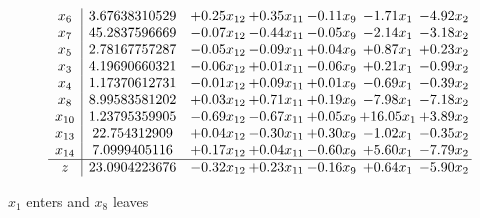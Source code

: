 \documentclass[9pt]{article}
\begin{document}
 \[\begin{array}{c| c c@{\hskip 2pt} c@{\hskip 2pt} c@{\hskip 2pt} c@{\hskip 2pt} c@{\hskip 2pt} }
 x_{6}   &  3.67638310529 & +  0.25 x_{12} & +  0.35 x_{11} & -0.11 x_{9} & -1.71 x_{1} & -4.92 x_{2}\\
 x_{7}   &  45.2837596669 & -0.07 x_{12} & -0.44 x_{11} & -0.05 x_{9} & -2.14 x_{1} & -3.18 x_{2}\\
 x_{5}   &  2.78167757287 & -0.05 x_{12} & -0.09 x_{11} & +  0.04 x_{9} & +  0.87 x_{1} & +  0.23 x_{2}\\
 x_{3}   &  4.19690660321 & -0.06 x_{12} & +  0.01 x_{11} & -0.06 x_{9} & +  0.21 x_{1} & -0.99 x_{2}\\
 x_{4}   &  1.17370612731 & -0.01 x_{12} & +  0.09 x_{11} & +  0.01 x_{9} & -0.69 x_{1} & -0.39 x_{2}\\
 x_{8}   &  8.99583581202 & +  0.03 x_{12} & +  0.71 x_{11} & +  0.19 x_{9} & -7.98 x_{1} & -7.18 x_{2}\\
 x_{10}   &  1.23795359905 & -0.69 x_{12} & -0.67 x_{11} & +  0.05 x_{9} & + 16.05 x_{1} & +  3.89 x_{2}\\
 x_{13}   &  22.754312909 & +  0.04 x_{12} & -0.30 x_{11} & +  0.30 x_{9} & -1.02 x_{1} & -0.35 x_{2}\\
 x_{14}   &  7.0999405116 & +  0.17 x_{12} & +  0.04 x_{11} & -0.60 x_{9} & +  5.60 x_{1} & -7.79 x_{2}\\
\hline
z    &  23.0904223676 & -0.32 x_{12} & +  0.23 x_{11} & -0.16 x_{9} & +  0.64 x_{1} & -5.90 x_{2}\\
\end{array}\]


 $ x_{1} $ enters and $ x_{8} $ leaves 
\end{document}
